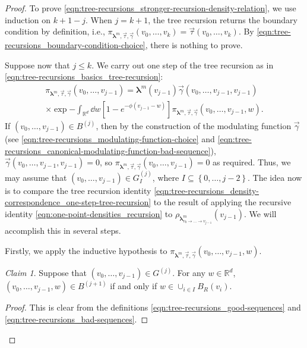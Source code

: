 \documentclass[11pt]{article}
\newcommand{\R}{\mathbb R}
\newcommand{\bl}{\bm{\lambda}}
\newcommand{\hcconst}{R}
\newcommand{\set}[1]{\left\{#1\right\}}
\numberwithin{equation}{section}
\theoremstyle{plain}
\theoremstyle{definition}
\theoremstyle{remark}
\newtheorem{claim}[theorem]{Claim}
\begin{document}
\begin{proof}
To prove \eqref{eqn:tree-recursions_stronger-recursion-density-relation}, we use induction on $k+1-j$.
When $j=k+1$, the tree recursion returns the boundary condition by definition, i.e., $\pi_{\bl^{m},\vec{\tau},\vec{\gamma}}(v_{0},\dots,v_{k})=\vec{\tau}(v_{0},\dots,v_{k})$.
By \eqref{eqn:tree-recursions_boundary-condition-choice}, there is nothing to prove.

Suppose now that $j\le k$.
We carry out one step of the tree recursion as in \eqref{eqn:tree-recursions_basics_tree-recursion}:
\begin{equation}
\label{eqn:tree-recursions_density-correspondence_one-step-tree-recursion}
\begin{multlined}
\pi_{\bl^{m},\vec{\tau},\vec{\gamma}}(v_{0},\dots,v_{j-1})=
\bl^{m}(v_{j-1})\vec{\gamma}(v_{0},\dots,v_{j-1},v_{j-1})
\\
\times\exp{-\int_{\R^{d}}\dd{w}\left[1-e^{-\phi(v_{j-1}-w)}\right]\pi_{\bl^{m},\vec{\tau},\vec{\gamma}}(v_{0},\dots,v_{j-1},w)}.
\end{multlined}
\end{equation}
If $(v_{0},\dots,v_{j-1})\in B^{(j)}$, then by the construction of the modulating function $\vec{\gamma}$ (see \eqref{eqn:tree-recursions_modulating-function-choice} and \eqref{eqn:tree-recursions_canonical-modulating-function-bad-sequence}), 
$\vec{\gamma}(v_{0},\dots,v_{j-1},v_{j-1})=0$, so $\pi_{\bl^{m},\vec{\tau},\vec{\gamma}}(v_{0},\dots,v_{j-1})=0$ as required.
Thus, we may assume that $(v_{0},\dots,v_{j-1})\in G^{(j)}_{I}$, where $I\subseteq\set{0,\dots,j-2}$.
The idea now is to compare the tree recursion identity \eqref{eqn:tree-recursions_density-correspondence_one-step-tree-recursion} to the result of applying the recursive identity \eqref{eqn:one-point-densities_recursion} to $\rho_{\bl^{m}_{v_{0}\rightarrow\dots\rightarrow v_{j-1}}}(v_{j-1})$.
We will accomplish this in several steps.

Firstly, we apply the inductive hypothesis to $\pi_{\bl^{m},\vec{\tau},\vec{\gamma}}(v_{0},\dots,v_{j-1},w)$.

\begin{claim}
\label{clm:tree-recursions_density-correspondence_bad-sequence-condition}
Suppose that $(v_{0},\dots,v_{j-1})\in G^{(j)}$.
For any $w\in\R^{d}$, $(v_{0},\dots,v_{j-1},w)\in B^{(j+1)}$ if and only if $w\in\cup_{i\in I}B_{\hcconst}(v_{i})$.
\end{claim}

\begin{proof}
This is clear from the definitions \eqref{eqn:tree-recursions_good-sequences} and \eqref{eqn:tree-recursions_bad-sequences}.
\end{proof}


\end{proof}
\end{document}
